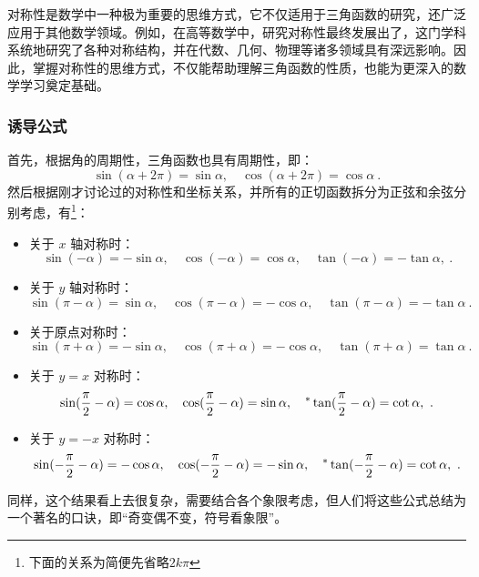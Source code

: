 对称性是数学中一种极为重要的思维方式，它不仅适用于三角函数的研究，还广泛应用于其他数学领域。例如，在高等数学中，研究对称性最终发展出了，这门学科系统地研究了各种对称结构，并在代数、几何、物理等诸多领域具有深远影响。因此，掌握对称性的思维方式，不仅能帮助理解三角函数的性质，也能为更深入的数学学习奠定基础。

\subsubsection{诱导公式}

首先，根据角的周期性，三角函数也具有周期性，即：
\begin{equation}
\sin(\alpha + 2\pi) = \sin \alpha, \quad \cos(\alpha + 2\pi) = \cos \alpha~.
\end{equation}
然后根据刚才讨论过的对称性和坐标关系，并所有的正切函数拆分为正弦和余弦分别考虑，有\footnote{下面的关系为简便先省略$2k\pi$}：
\begin{itemize}
\item 关于 $x$ 轴对称时：
\begin{equation}
\sin(-\alpha)=-\sin\alpha,\quad \cos(-\alpha) = \cos \alpha,\quad \tan(-\alpha)=-\tan\alpha,~.
\end{equation}
\item 关于 $y$ 轴对称时：
\begin{equation}
\sin(\pi-\alpha)=\sin\alpha,\quad \cos(\pi-\alpha) = -\cos \alpha,\quad \tan(\pi-\alpha)=-\tan\alpha~.
\end{equation}
\item 关于原点对称时：
\begin{equation}
\sin(\pi+\alpha)=-\sin\alpha,\quad \cos(\pi+\alpha) = -\cos \alpha,\quad \tan(\pi+\alpha) = \tan \alpha~.
\end{equation}
\item 关于 $y = x$ 对称时：
\begin{equation}
\sin({\pi\over2}-\alpha)=\cos\alpha,\quad \cos({\pi\over2}-\alpha) = \sin \alpha,\quad ^*\tan({\pi\over2}-\alpha) = \cot \alpha,~.
\end{equation}
\item 关于 $y = -x$ 对称时：
\begin{equation}
\sin(-{\pi\over2}-\alpha)=-\cos\alpha,\quad \cos(-{\pi\over2}-\alpha) = -\sin \alpha,\quad ^*\tan(-{\pi\over2}-\alpha) = \cot \alpha,~.
\end{equation}
\end{itemize}



同样，这个结果看上去很复杂，需要结合各个象限考虑，但人们将这些公式总结为一个著名的口诀，即“奇变偶不变，符号看象限”。

